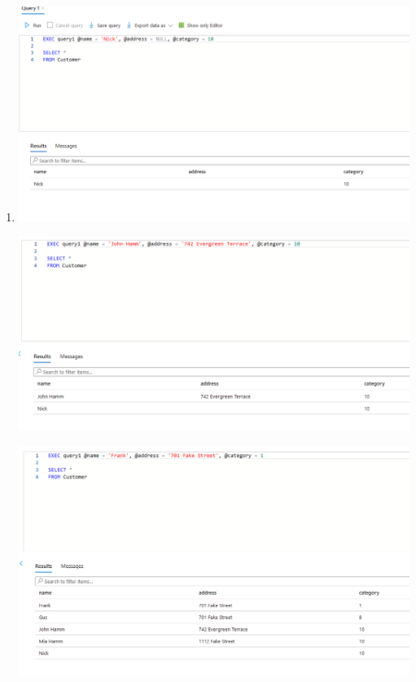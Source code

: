 \documentclass[11pt]{article}
\begin{document}
\begin{enumerate}
\item 
\includegraphics[width = \textwidth]{insertCust1.png}

\includegraphics[width = \textwidth]{insertCust2.png}

\includegraphics[width = \textwidth]{insertCust3.png}


\end{enumerate}
\end{document}
